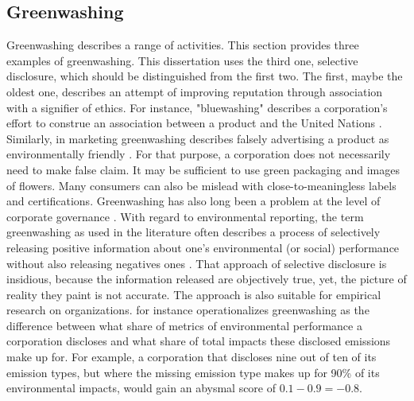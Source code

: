 \subsection{Greenwashing}

Greenwashing describes a range of activities. This section provides three examples of greenwashing. This dissertation uses the third one, selective disclosure, which should be distinguished from the first two. The first, maybe the oldest one, describes an attempt of improving reputation through association with a signifier of ethics. For instance, "bluewashing" describes a corporation's effort to construe an association between a product and the United Nations \citep{Laufer2003}. 
Similarly, in marketing greenwashing describes falsely advertising a product as environmentally friendly \citep{Delmas2011}. For that purpose, a corporation does not necessarily need to make false claim. It may be sufficient to use green packaging and images of flowers. Many consumers can also be mislead with close-to-meaningless labels and certifications. 
Greenwashing has also long been a problem at the level of corporate governance \citep{Ramus2005}. With regard to environmental reporting, the term greenwashing as used in the literature often describes a process of selectively releasing positive information about one's environmental (or social) performance without also releasing negatives ones \citep{Lyon2011}. That approach of selective disclosure is insidious, because the information released are objectively true, yet, the picture of reality they paint is not accurate. The approach is also suitable for empirical research on organizations. \citet{Marquis2016} for instance operationalizes greenwashing as the difference between what share of metrics of environmental performance a corporation discloses and what share of total impacts these disclosed emissions make up for. For example, a corporation that discloses nine out of ten of its emission types, but where the missing emission type makes up for 90\% of its environmental impacts, would gain an abysmal score of $0.1 - 0.9 = -0.8$.

